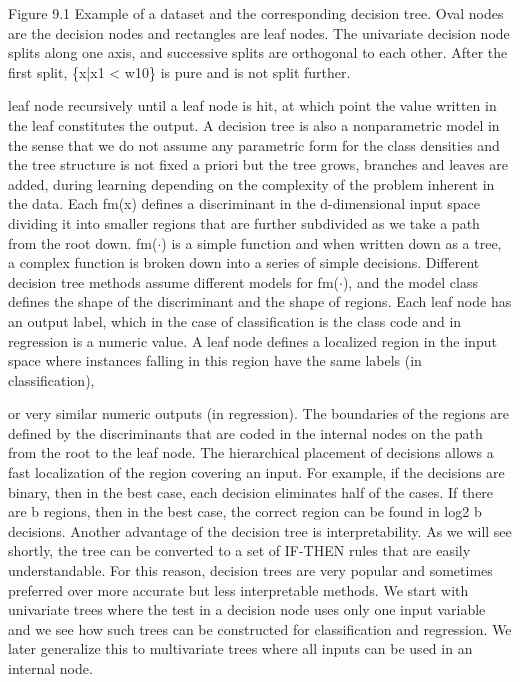 Figure 9.1 Example of a dataset and the corresponding decision tree. Oval nodes are the decision nodes and rectangles are leaf nodes. The univariate decision node splits along one axis, and successive splits are orthogonal to each other. After the first split, \{x|x1 < w10\} is pure and is not split further.

leaf node recursively until a leaf node is hit, at which point the value written in the leaf constitutes the output. A decision tree is also a nonparametric model in the sense that we do not assume any parametric form for the class densities and the tree structure is not fixed a priori but the tree grows, branches and leaves are added, during learning depending on the complexity of the problem inherent in the data. Each fm(x) defines a discriminant in the d-dimensional input space dividing it into smaller regions that are further subdivided as we take a path from the root down. fm($\cdot$) is a simple function and when written down as a tree, a complex function is broken down into a series of simple decisions. Different decision tree methods assume different models for fm($\cdot$), and the model class defines the shape of the discriminant and the shape of regions. Each leaf node has an output label, which in the case of classification is the class code and in regression is a numeric value. A leaf node defines a localized region in the input space where instances falling in this region have the same labels (in classification),

or very similar numeric outputs (in regression). The boundaries of the regions are defined by the discriminants that are coded in the internal nodes on the path from the root to the leaf node. The hierarchical placement of decisions allows a fast localization of the region covering an input. For example, if the decisions are binary, then in the best case, each decision eliminates half of the cases. If there are b regions, then in the best case, the correct region can be found in log2 b decisions. Another advantage of the decision tree is interpretability. As we will see shortly, the tree can be converted to a set of IF-THEN rules that are easily understandable. For this reason, decision trees are very popular and sometimes preferred over more accurate but less interpretable methods. We start with univariate trees where the test in a decision node uses only one input variable and we see how such trees can be constructed for classification and regression. We later generalize this to multivariate trees where all inputs can be used in an internal node.

